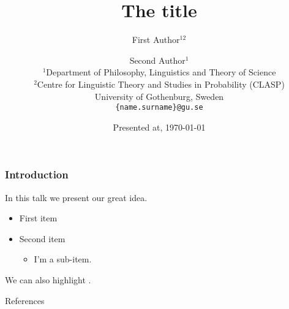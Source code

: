 \documentclass[aspectratio=1610]{beamer} %
\title{The title}
\author{First Author$^{12}$ \and Second Author$^{1}$ \\
        $^{1}$Department of Philosophy, Linguistics and Theory of Science \\ 
        $^{2}$Centre for Linguistic Theory and Studies in Probability (CLASP) \\
        University of Gothenburg, Sweden \\
      \texttt{\{name.surname\}@gu.se}}
\date{Presented at, \today}
\begin{document}
\frame[plain]{\titlepage}










\begin{frame}

\frametitle{Introduction}

In this talk we present our great idea.

\begin{itemize}
  
\item First item

\item Second item
  \begin{itemize}

  \item I'm a sub-item.

  \end{itemize}

\end{itemize}

\bigskip

We can also highlight .


\end{frame}






\begin{frame}[allowframebreaks]{References}

\small






\end{frame}
\end{document}
